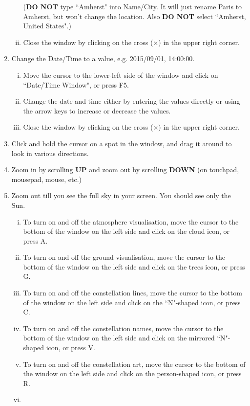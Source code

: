 \documentclass[main.tex]{subfiles}
\begin{document}
\begin{enumerate}
\begin{enumerate}[i.]
    (\textbf{DO NOT} type ``Amherst" into Name/City. It will just rename Paris to Amherst, but won't change the location. Also \textbf{DO NOT} select ``Amherst, United States".)
    \item
    Close the window by clicking on the cross ($\times$) in the upper right corner.
\end{enumerate}
\item
Change the Date/Time to a value, e.g. 2015/09/01, 14:00:00.
\begin{enumerate}[i.]
    \item
    Move the cursor to the lower-left side of the window and click on ``Date/Time Window", or press F5.
    \item
    Change the date and time either by entering the values directly or using the arrow keys to increase or decrease the values.
    \item
    Close the window by clicking on the cross ($\times$) in the upper right corner.
\end{enumerate}
\item
Click and hold the cursor on a spot in the window, and drag it around to look in various directions.
\item
Zoom in by scrolling \textbf{UP} and zoom out by scrolling \textbf{DOWN} (on touchpad, mousepad, mouse, etc.)
\item
Zoom out till you see the full sky in your screen. You should see only the Sun.
\begin{enumerate}[i.]
    \item
    To turn on and off the atmosphere visualisation, move the cursor to the bottom of the window on the left side and click on the cloud icon, or press A.
    \item
    To turn on and off the ground visualisation, move the cursor to the bottom of the window on the left side and click on the trees icon, or press G.
    \item
    To turn on and off the constellation lines, move the cursor to the bottom of the window on the left side and click on the ``N"-shaped icon, or press C.
    \item
    To turn on and off the constellation names, move the cursor to the bottom of the window on the left side and click on the mirrored ``N"-shaped icon, or press V.
    \item
    To turn on and off the constellation art, move the cursor to the bottom of the window on the left side and click on the person-shaped icon, or press R.
    \item

\end{enumerate}
\end{enumerate}
\end{document}
